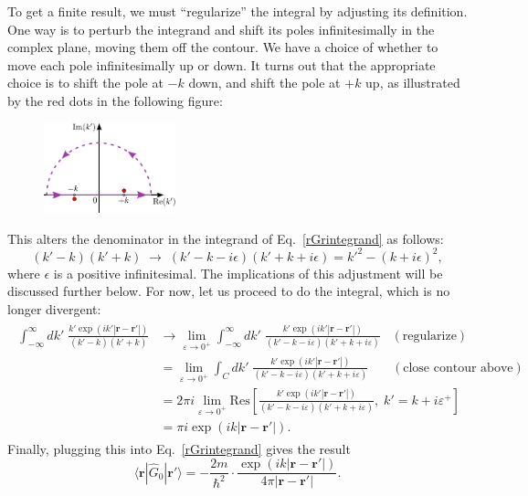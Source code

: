 \documentclass[prx,12pt]{revtex4-2}
\begin{document}
To get a finite result, we must ``regularize'' the integral by
adjusting its definition.  One way is to perturb the integrand and
shift its poles infinitesimally in the complex plane, moving them off
the contour.  We have a choice of whether to move each pole
infinitesimally up or down.  It turns out that the appropriate choice
is to shift the pole at $-k$ down, and shift the pole at $+k$ up, as
illustrated by the red dots in the following figure:

\begin{figure}[h!]
  \centering\includegraphics[width=0.34\textwidth]{greencontour}
\end{figure}

\noindent
This alters the denominator in the integrand of
Eq.~\eqref{rGrintegrand} as follows:
\begin{equation}
  (k' - k)(k'+k) \;\rightarrow\; (k' - k - i\epsilon)(k'+k+i\epsilon) = {k'}^2 - (k+i\epsilon)^2,
  \label{kregularization}
\end{equation}
where $\epsilon$ is a positive infinitesimal.  The implications of
this adjustment will be discussed further below.  For now, let us
proceed to do the integral, which is no longer divergent:
\begin{align*}
  \begin{aligned}\int_{-\infty}^\infty dk' \; \frac{\displaystyle k' \exp\left(ik'|\mathbf{r}-\mathbf{r}'|\right)}{(k' - k)(k'+k)} &\rightarrow \lim_{\varepsilon \rightarrow 0^+} \int_{-\infty}^\infty dk' \; \frac{\displaystyle k' \exp\left(ik'|\mathbf{r}-\mathbf{r}'|\right)}{(k' - k - i\varepsilon)(k'+k+i\varepsilon)}\;\;\; (\text{regularize}) \\ &= \lim_{\varepsilon \rightarrow 0^+} \int_C dk' \; \frac{\displaystyle k' \exp\left(ik'|\mathbf{r}-\mathbf{r}'|\right)}{(k' - k - i\varepsilon)(k'+k+i\varepsilon)} \quad\;\;\; (\text{close contour above}) \\ &= 2\pi i \lim_{\varepsilon \rightarrow 0^+} \mathrm{Res}\left[\frac{\displaystyle k' \exp\left(ik'|\mathbf{r}-\mathbf{r}'|\right)}{(k' - k - i\varepsilon)(k'+k+i\varepsilon)}, \;k'=k+i\varepsilon^+\right] \\ &= \pi i \exp\left(ik|\mathbf{r}-\mathbf{r}'|\right).\end{aligned}
\end{align*}
Finally, plugging this into Eq.~\eqref{rGrintegrand} gives the result
\begin{equation}
  \langle\mathbf{r}|\hat{G}_0|\mathbf{r}'\rangle = -\frac{2m}{\hbar^2}
  \cdot \frac{\exp\left(ik|\mathbf{r}-\mathbf{r}'|\right)}{4\pi|\mathbf{r}-\mathbf{r}'|}.
  \label{3dprop}
\end{equation}
\end{document}
